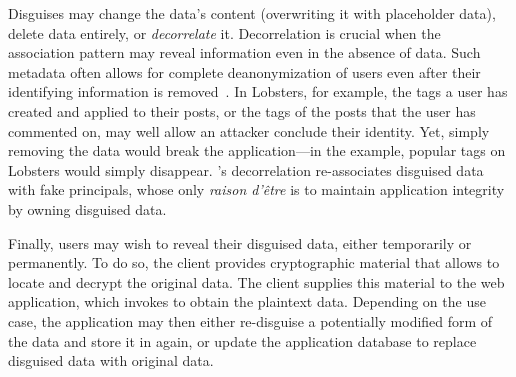 %
Disguises may change the data's content (\eg overwriting it with placeholder data),
delete data entirely, or \emph{decorrelate} it.
%
Decorrelation is crucial when the association pattern may reveal information
even in the absence of data.
%
Such metadata often allows for complete deanonymization of users even after their
identifying information is removed~\cite{xxx}.
%
In Lobsters, for example, the tags a user has created and applied to their posts,
or the tags of the posts that the user has commented on, may well allow an attacker
conclude their identity.
%
Yet, simply removing the data would break the application---in the example,
popular tags on Lobsters would simply disappear.
%
\sys's decorrelation re-associates disguised data with fake principals, whose
only \emph{raison d'être} is to maintain application integrity by owning disguised
data.
%

%
Finally, users may wish to reveal their disguised data, either temporarily or
permanently.
%
To do so, the client provides cryptographic material that allows \sys to locate
and decrypt the original data.
%
The client supplies this material to the web application, which invokes \sys
to obtain the plaintext data.
%
Depending on the use case, the application may then either re-disguise a
potentially modified form of the data and store it in \sys again, or update the
application database to replace disguised data with original data.
%
